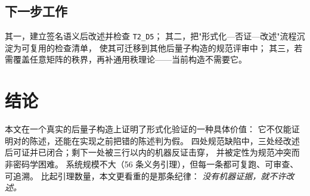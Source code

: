 \documentclass[UTF8,fontset=windows,zihao=-4,a4paper]{ctexart}
\newcommand{\code}[1]{\texttt{#1}}
\begin{document}
\subsection{下一步工作}
其一，建立签名语义后改述并检查 \code{T2\_D5}；
其二，把"形式化—否证—改述"流程沉淀为可复用的检查清单，
使其可迁移到其他后量子构造的规范评审中；
其三，若需覆盖任意矩阵的秩界，再补通用秩理论——当前构造不需要它。

\section{结论}
本文在一个真实的后量子构造上证明了形式化验证的一种具体价值：
它不仅能证明对的陈述，还能在实现之前把错的陈述判为假。
四处规范缺陷中，三处经改述后可证并已闭合；剩下一处被三行以内的机器反证击穿，
并被定性为规范冲突而非密码学困难。
系统规模不大（56 条义务引理），但每一条都可复跑、可审查、可追溯。
比起引理数量，本文更看重的是那条纪律：
\emph{没有机器证据，就不许改述。}
\end{document}
